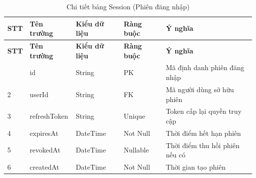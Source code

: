 \begin{longtable}{|p{0.7cm}|p{3.3cm}|p{1.9cm}|p{2.1cm}|p{5.4cm}|}
    \caption{Chi tiết bảng Session (Phiên đăng nhập)}
    \label{tab:db_session} \\
    \hline
    \textbf{STT} & \textbf{Tên trường} & \textbf{Kiểu dữ liệu} & \textbf{Ràng buộc} & \textbf{Ý nghĩa} \\
    \hline
    \endfirsthead
    \hline
    \textbf{STT} & \textbf{Tên trường} & \textbf{Kiểu dữ liệu} & \textbf{Ràng buộc} & \textbf{Ý nghĩa} \\
    \hline
    \endhead
    \hline
    \endfoot
    \hline
    \endlastfoot
    1 & id & String & PK & Mã định danh phiên đăng nhập \\ \hline
    2 & userId & String & FK & Mã người dùng sở hữu phiên \\ \hline
    3 & refreshToken & String & Unique & Token cấp lại quyền truy cập \\ \hline
    4 & expiresAt & DateTime & Not Null & Thời điểm hết hạn phiên \\ \hline
    5 & revokedAt & DateTime & Nullable & Thời điểm thu hồi phiên nếu có \\ \hline
    6 & createdAt & DateTime & Not Null & Thời gian tạo phiên \\
\end{longtable}
